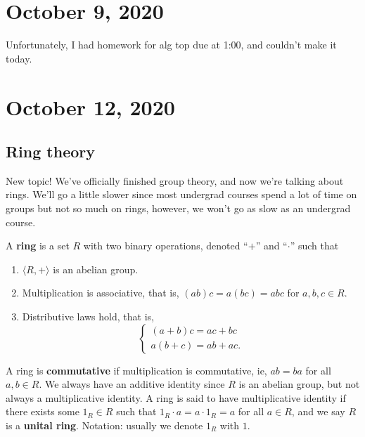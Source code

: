 \section{October 9, 2020}
Unfortunately, I had homework for alg top due at 1:00, and couldn't make it today.
\section{October 12, 2020}
\subsection{Ring theory}
New topic! We've officially finished group theory, and now we're talking about rings. We'll go a little slower since most undergrad courses spend a lot of time on groups but not so much on rings, however, we won't go as slow as an undergrad course.
\begin{definition}[Ring]
    A \textbf{ring}  is a set $R$ with two binary operations, denoted ``$+$'' and ``$\cdot $'' such that 
    \begin{enumerate}
        \item $\langle R,+ \rangle $ is an abelian group.
        \item Multiplication is associative, that is, $(ab)c=a(bc)=abc$ for $a,b,c \in R$.
        \item Distributive laws hold, that is,
           \[
           \begin{cases}
               (a+b)c=ac+bc\\
               a(b+c)=ab+ac.
           \end{cases}
           \]  
    \end{enumerate}
    A ring is \textbf{commutative} if multiplication is commutative, ie, $ab=ba$ for all $a,b\in R$. We always have an additive identity since $R$ is an abelian group, but not always a multiplicative identity. A ring is said to have multiplicative identity if there exists some $1_R\in R$ such that $1_R\cdot a=a\cdot 1_R=a$ for all $a\in R$, and we say $R$ is a \textbf{unital ring}. Notation: usually we denote $1_R$ with $1$.
\end{definition}
